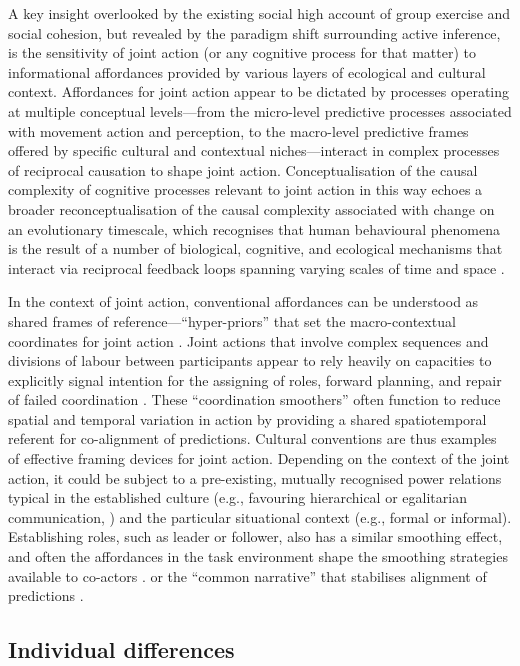 \begin{CJK}{UTF8}{gbsn}
A key insight overlooked by the existing social high account of group exercise and social cohesion, but revealed by the paradigm shift surrounding active inference, is the sensitivity of joint action (or any cognitive process for that matter) to informational affordances provided by various layers of ecological and cultural context.  Affordances for joint action appear to be dictated by processes operating at multiple conceptual levels---from the micro-level predictive processes associated with movement action and perception, to the macro-level predictive frames offered by specific cultural and contextual niches---interact in complex processes of reciprocal causation to shape joint action.  Conceptualisation of the causal complexity of cognitive processes relevant to joint action in this way echoes a broader reconceptualisation of the causal complexity associated with change on an evolutionary timescale, which recognises that human behavioural phenomena is the result of a number of biological, cognitive, and ecological mechanisms that interact via reciprocal feedback loops spanning varying scales of time and space \citep{Fuentes2015}.

In the context of joint action, conventional affordances can be understood as shared frames of reference---``hyper-priors'' that set the macro-contextual coordinates for joint action \citep{Clark2013}. Joint actions that involve complex sequences and divisions of labour between participants appear to rely heavily on capacities to explicitly signal intention for the assigning of roles, forward planning, and repair of failed coordination \citep{Frith2010}.  These ``coordination smoothers'' \citep{Vesper2017} often function to reduce spatial and temporal variation in action by providing a shared spatiotemporal referent for co-alignment of predictions.  Cultural conventions are thus examples of effective framing devices for joint action.  Depending on the context of the joint action, it could be subject to a pre-existing, mutually recognised power relations typical in the established culture (e.g., favouring hierarchical or egalitarian communication, \citep[see]{Cheon2011}) and the particular situational context (e.g., formal or informal).  Establishing roles, such as leader or follower, also has a similar smoothing effect, and often the affordances in the task environment shape the smoothing strategies available to co-actors \citep{Marsh2009}.
or the ``common narrative'' that stabilises alignment of predictions \citep{Friston2015}.


\subsection{Individual differences\label{sect:individualDifferences}}


\end{CJK}
